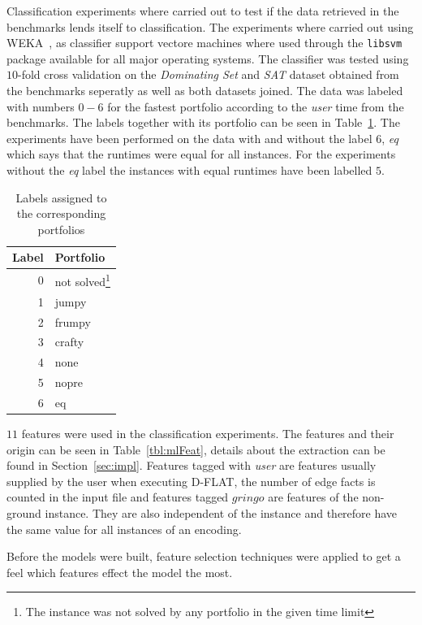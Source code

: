 Classification experiments where carried out to test if the data retrieved in the benchmarks lends itself to classification. The experiments where carried out using WEKA~\cite{WEKA}, as classifier support vectore machines where used through the \lstinline$libsvm$ package available for all major operating systems. The classifier was tested using $10$-fold cross validation on the \emph{Dominating Set} and \emph{SAT} dataset obtained from the benchmarks seperatly as well as both datasets joined. The data was labeled with numbers $0-6$ for the fastest portfolio according to the \emph{user} time from the benchmarks.
The labels together with its portfolio can be seen in Table~\ref{tbl:mlLabel}. The experiments have been performed on the data with and without the label $6$, \emph{eq} which says that the runtimes were equal for all instances. For the experiments without the \emph{eq} label the instances with equal runtimes have been labelled $5$.
\begin{table}[h]
	\center
	\begin{tabular}{|r|l|}
		\hline
		Label & Portfolio\\
		\hline
		0 & not solved\footnote{The instance was not solved by any portfolio in the given time limit} \\ %
		1 & jumpy\\
		2 & frumpy\\
		3 & crafty\\
		4 & none \\
		5 & nopre\\
		6 & eq\\
		\hline
	\end{tabular}
	\caption{Labels assigned to the corresponding portfolios}
	\label{tbl:mlLabel}
\end{table}


\par $11$ features were used in the classification experiments. The features and their origin can be seen in Table~\ref{tbl:mlFeat}, details about the extraction can be found in Section~\ref{sec:impl}. Features tagged with \emph{user} are features usually supplied by the user when executing D-FLAT, the number of edge facts is counted in the input file and features tagged $gringo$ are features of the non-ground instance. They are also independent of the instance and therefore have the same value for all instances of an encoding. 

Before the models were built, feature selection techniques were applied to get a feel which features effect the model the most.

